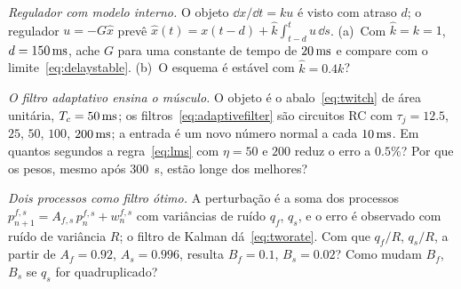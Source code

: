 \begin{exercise}[\lvlB]
\label{ex:15:5}
\emph{Regulador com modelo interno.} O objeto $\dd x/\dd t=ku$ é visto com atraso $d$; o regulador $u=-G\hat x$ prevê $\hat x(t)=x(t-d)+\hat k\int_{t-d}^{t}u\,\dd s$. (a)~Com $\hat k=k=1$, $d=150\,\text{ms}$, ache $G$ para uma constante de tempo de $20\,\text{ms}$ e compare com o limite~\eqref{eq:delaystable}. (b)~O esquema é estável com $\hat k=0.4k$?
\end{exercise}

\begin{exercise}[\lvlB]
\label{ex:15:6}
\emph{O filtro adaptativo ensina o músculo.} O objeto é o abalo~\eqref{eq:twitch} de área unitária, $T_c=50\,\text{ms}$; os filtros~\eqref{eq:adaptivefilter} são circuitos RC com $\tau_j=12.5$, $25$, $50$, $100$, $200\,\text{ms}$; a entrada é um novo número normal a cada $10\,\text{ms}$. Em quantos segundos a regra~\eqref{eq:lms} com $\eta=50$ e $200$ reduz o erro a $0.5\%$? Por que os pesos, mesmo após $300$~s, estão longe dos melhores?
\end{exercise}

\begin{exercise}[\lvlC]
\label{ex:15:7}
\emph{Dois processos como filtro ótimo.} A perturbação é a soma dos processos $p^{f,s}_{n+1}=A_{f,s}\,p^{f,s}_n+w^{f,s}_n$ com variâncias de ruído $q_f$, $q_s$, e o erro é observado com ruído de variância $R$; o filtro de Kalman dá~\eqref{eq:tworate}. Com que $q_f/R$, $q_s/R$, a partir de $A_f=0.92$, $A_s=0.996$, resulta $B_f=0.1$, $B_s=0.02$? Como mudam $B_f$, $B_s$ se $q_s$ for quadruplicado?
\end{exercise}
